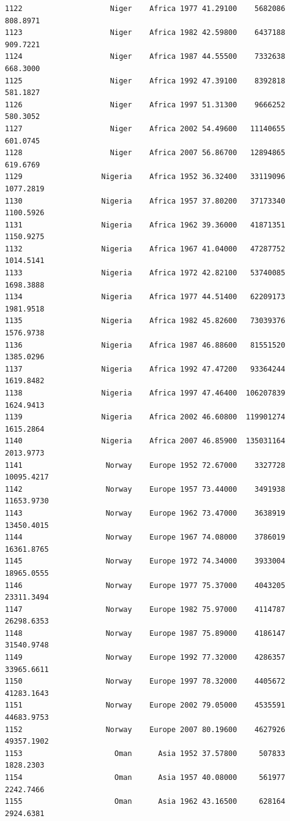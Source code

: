 \documentclass[
  letterpaper,
  DIV=11,
  numbers=noendperiod]{scrreprt}
\begin{document}
\begin{verbatim}
1122                    Niger    Africa 1977 41.29100    5682086    808.8971
1123                    Niger    Africa 1982 42.59800    6437188    909.7221
1124                    Niger    Africa 1987 44.55500    7332638    668.3000
1125                    Niger    Africa 1992 47.39100    8392818    581.1827
1126                    Niger    Africa 1997 51.31300    9666252    580.3052
1127                    Niger    Africa 2002 54.49600   11140655    601.0745
1128                    Niger    Africa 2007 56.86700   12894865    619.6769
1129                  Nigeria    Africa 1952 36.32400   33119096   1077.2819
1130                  Nigeria    Africa 1957 37.80200   37173340   1100.5926
1131                  Nigeria    Africa 1962 39.36000   41871351   1150.9275
1132                  Nigeria    Africa 1967 41.04000   47287752   1014.5141
1133                  Nigeria    Africa 1972 42.82100   53740085   1698.3888
1134                  Nigeria    Africa 1977 44.51400   62209173   1981.9518
1135                  Nigeria    Africa 1982 45.82600   73039376   1576.9738
1136                  Nigeria    Africa 1987 46.88600   81551520   1385.0296
1137                  Nigeria    Africa 1992 47.47200   93364244   1619.8482
1138                  Nigeria    Africa 1997 47.46400  106207839   1624.9413
1139                  Nigeria    Africa 2002 46.60800  119901274   1615.2864
1140                  Nigeria    Africa 2007 46.85900  135031164   2013.9773
1141                   Norway    Europe 1952 72.67000    3327728  10095.4217
1142                   Norway    Europe 1957 73.44000    3491938  11653.9730
1143                   Norway    Europe 1962 73.47000    3638919  13450.4015
1144                   Norway    Europe 1967 74.08000    3786019  16361.8765
1145                   Norway    Europe 1972 74.34000    3933004  18965.0555
1146                   Norway    Europe 1977 75.37000    4043205  23311.3494
1147                   Norway    Europe 1982 75.97000    4114787  26298.6353
1148                   Norway    Europe 1987 75.89000    4186147  31540.9748
1149                   Norway    Europe 1992 77.32000    4286357  33965.6611
1150                   Norway    Europe 1997 78.32000    4405672  41283.1643
1151                   Norway    Europe 2002 79.05000    4535591  44683.9753
1152                   Norway    Europe 2007 80.19600    4627926  49357.1902
1153                     Oman      Asia 1952 37.57800     507833   1828.2303
1154                     Oman      Asia 1957 40.08000     561977   2242.7466
1155                     Oman      Asia 1962 43.16500     628164   2924.6381

\end{verbatim}
\end{document}
